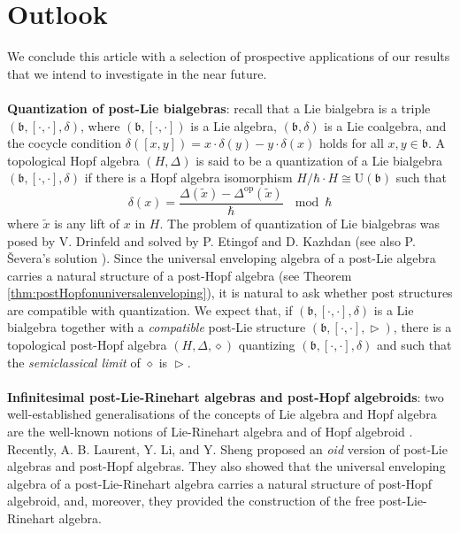 \documentclass[10pt]{article}
\theoremstyle{definition}
\newcommand{\wt}{\vartriangleright}
\renewcommand{\wp}{\diamond}
\begin{document}
\section{Outlook}\label{sec:outlook}
We conclude this article with a selection of prospective applications of our results that we intend to investigate in the near future. \\ \\
\textbf{Quantization of post-Lie bialgebras}: recall that a Lie bialgebra is a triple $(\mathfrak{b},[\cdot,\cdot],\delta)$, where $(\mathfrak{b},[\cdot,\cdot])$ is a Lie algebra, $(\mathfrak{b},\delta)$ is a Lie coalgebra, and the cocycle condition $\delta([x,y])= x \cdot\delta(y) - y \cdot \delta(x)$ holds for all $x,y \in \mathfrak{b}$. A topological Hopf algebra $(H,\Delta)$ is said to be a quantization of a Lie bialgebra $(\mathfrak{b},[\cdot,\cdot],\delta)$ if there is a Hopf algebra isomorphism $H/\hbar \cdot H \cong \mathrm{U}(\mathfrak{b})$ such that 
\[ \delta(x) = \frac{\Delta(\tilde{x}) - \Delta^{\mathrm{op}}(\tilde{x})}{\hbar} \ \mod \hbar\]
where $\tilde{x}$ is any lift of $x$ in $H$. The problem of quantization of Lie bialgebras was posed by V. Drinfeld \cite{Drinfeld90} and solved by P. Etingof and D. Kazhdan \cite{EK} (see also P. \v{S}evera's solution \cite{Sev}). Since the universal enveloping algebra of a post-Lie algebra carries a natural structure of a post-Hopf algebra (see Theorem \ref{thm:postHopfonuniversalenveloping}), it is natural to ask whether post structures are compatible with quantization. We expect that, if  $(\mathfrak{b},[\cdot,\cdot],\delta)$ is a Lie bialgebra together with a \emph{compatible} post-Lie structure  $(\mathfrak{b},[\cdot,\cdot],\wt)$, there is a topological post-Hopf algebra $(H,\Delta,\wp)$ quantizing  $(\mathfrak{b},[\cdot,\cdot],\delta)$ and such that the \emph{semiclassical limit} of $\wp$ is $\wt$. \\ \\
\textbf{Infinitesimal post-Lie-Rinehart algebras and post-Hopf algebroids}: two well-established generalisations of the concepts of Lie algebra and Hopf algebra are the well-known notions of Lie-Rinehart algebra \cite{Rinehart} and of Hopf algebroid \cite{Lu}. %
Recently, A. B. Laurent, Y. Li, and Y. Sheng \cite{LLS} proposed an \emph{oid} version of post-Lie algebras and post-Hopf algebras. They also showed that the universal enveloping algebra of a post-Lie-Rinehart algebra carries a natural structure of post-Hopf algebroid, and, moreover, they provided the construction of the free post-Lie-Rinehart algebra. \\
\end{document}

